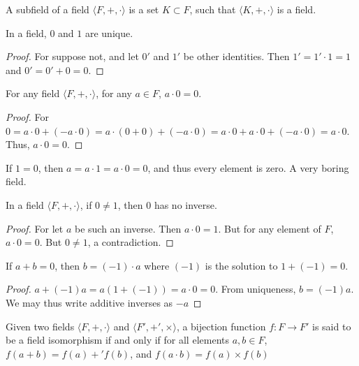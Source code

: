 \documentclass[crop=false,class=book,oneside]{standalone}
\begin{document}
        \begin{definition}
        A subfield of a field $\langle F,+,\cdot \rangle$ is a set $K\subset F$, such that $\langle K, +,\cdot \rangle$ is a field.
        \end{definition}
        \begin{theorem}
        In a field, $0$ and $1$ are unique.
        \end{theorem}
        \begin{proof}
        For suppose not, and let $0'$ and $1'$ be other identities. Then $1'=1'\cdot 1 = 1$ and $0'=0'+0=0$.
        \end{proof}
        \begin{theorem}
        For any field $\langle F,+,\cdot \rangle$, for any $a\in F$, $a\cdot 0 = 0$.
        \end{theorem}
        \begin{proof}
        For $0 = a\cdot 0 + (-a\cdot 0) = a\cdot(0+0) +(-a\cdot 0) = a\cdot 0 + a\cdot 0 + (-a\cdot 0) = a\cdot 0$. Thus, $a\cdot 0 = 0$.
        \end{proof}
        \begin{remark}
        If $1=0$, then $a=a\cdot 1 = a\cdot 0 = 0$, and thus every element is zero. A very boring field.
        \end{remark}
        \begin{corollary}
        In a field $\langle F, +,\cdot \rangle$, if $0\ne 1$, then $0$ has no inverse.
        \end{corollary}
        \begin{proof}
        For let $a$ be such an inverse. Then $a\cdot 0 = 1$. But for any element of $F$, $a \cdot 0 = 0$. But $0\ne 1$, a contradiction.
        \end{proof}
        \begin{theorem}
        If $a+b = 0$, then $b= (-1)\cdot a$ where $(-1)$ is the solution to $1+(-1)=0$.
        \end{theorem}
        \begin{proof}
        $a+(-1)a = a(1+(-1)) = a\cdot 0 = 0$. From uniqueness, $b=(-1)a$. We may thus write additive inverses as $-a$
        \end{proof}
        \begin{definition}
        Given two fields $\langle F,+,\cdot \rangle$ and $\langle F', +',\times \rangle$, a bijection function $f:F\rightarrow F'$ is said to be a field isomorphism if and only if for all elements $a,b\in F$, $f(a+b)=f(a)+'f(b)$, and $f(a\cdot b) = f(a)\times f(b)$
        \end{definition}
\end{document}
